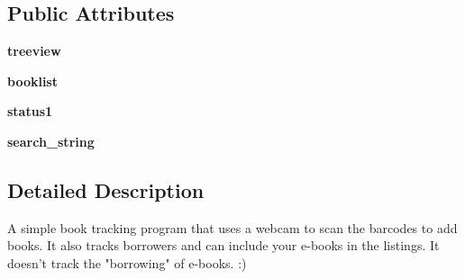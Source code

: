 \subsection*{Public Attributes}
\begin{DoxyCompactItemize}
\item 
\hypertarget{classlibrarian_1_1librarian_a388a1808d92bbfe00eb3202255a18d67}{
{\bfseries treeview}}
\label{classlibrarian_1_1librarian_a388a1808d92bbfe00eb3202255a18d67}

\item 
\hypertarget{classlibrarian_1_1librarian_a2e4ace15e14d76e6efcc52394c2735d7}{
{\bfseries booklist}}
\label{classlibrarian_1_1librarian_a2e4ace15e14d76e6efcc52394c2735d7}

\item 
\hypertarget{classlibrarian_1_1librarian_a61d3be0b3ed7deafe20920ba3251ad60}{
{\bfseries status1}}
\label{classlibrarian_1_1librarian_a61d3be0b3ed7deafe20920ba3251ad60}

\item 
\hypertarget{classlibrarian_1_1librarian_a51db0360df10027019aac65883b41724}{
{\bfseries search\_\-string}}
\label{classlibrarian_1_1librarian_a51db0360df10027019aac65883b41724}

\end{DoxyCompactItemize}


\subsection{Detailed Description}
\begin{DoxyVerb}
A simple book tracking program that uses a webcam to scan the barcodes
to add books.  It also tracks borrowers and can include your e-books
in the listings.  It doesn't track the "borrowing" of e-books. :)
\end{DoxyVerb}
 

